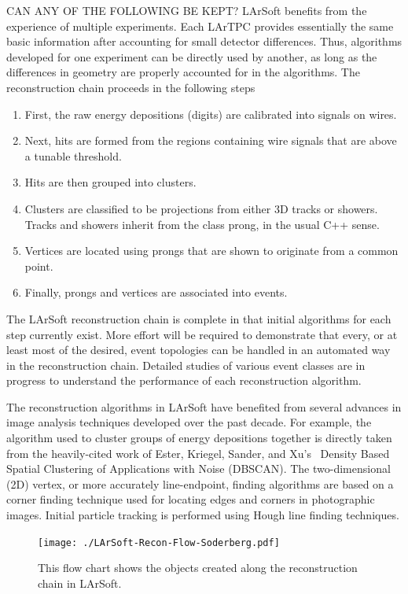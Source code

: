 \documentclass[12pt]{elsarticle}
\begin{document}
CAN ANY OF THE FOLLOWING BE KEPT?
LArSoft  benefits from the experience of multiple experiments.  Each LArTPC provides essentially the same basic information after accounting for small detector differences.  Thus, algorithms developed for one experiment can be directly used by another, as long as the differences in geometry are properly accounted for in the algorithms.  The reconstruction chain proceeds in the following steps
\begin{enumerate}
\item First, the raw energy depositions (digits) are calibrated into signals on wires.
\item Next, hits are formed from the regions containing wire signals that are above a tunable threshold.
\item Hits are then grouped into clusters.
\item Clusters are classified to be projections from either 3D tracks or showers. Tracks and showers inherit from the class prong, in the usual C++ sense.
\item Vertices are located using prongs that are shown to originate from a common point.
\item Finally, prongs and vertices are associated into events.
\end{enumerate}
The LArSoft reconstruction chain is complete in that initial algorithms for each step currently exist.  More effort will be required to demonstrate that every, or at least most of the desired, event topologies can be handled in an automated way in the reconstruction chain. Detailed studies of various event classes are in progress to understand the performance of each reconstruction algorithm.

The reconstruction algorithms in LArSoft have benefited from several advances in image analysis techniques developed over the past decade.  For example, the algorithm used to cluster groups of energy depositions together is directly taken from the heavily-cited work of Ester, Kriegel, Sander, and Xu's~\cite{} Density Based Spatial Clustering of Applications with Noise (DBSCAN). The two-dimensional (2D) vertex, or more accurately line-endpoint, finding algorithms are based on a corner finding technique used for locating edges and corners in photographic images.  Initial particle tracking is performed using Hough line finding techniques.

\hspace*{2cm}
\begin{figure}[h]
\centering
\caption{This flow chart shows the objects created along the reconstruction chain in LArSoft.}
\texttt{[image: ./LArSoft-Recon-Flow-Soderberg.pdf]}
\label{flow}
\end{figure}
\end{document}
